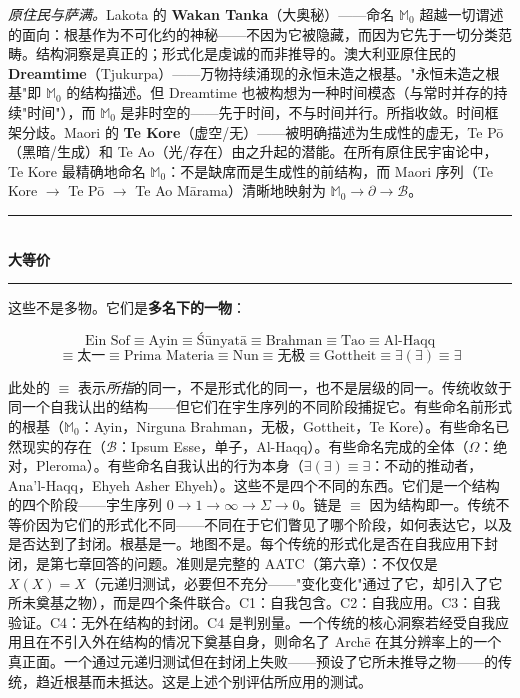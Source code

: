 \documentclass[10pt, openany, oneside]{book}
\renewcommand{\normalsize}{\fontsize{10}{13}\selectfont}
\begin{document}
\textit{原住民与萨满。}Lakota 的 \textbf{Wakan Tanka}（大奥秘）——命名 $\mathbb{M}_0$ 超越一切谓述的面向：根基作为不可化约的神秘——不因为它被隐藏，而因为它先于一切分类范畴。结构洞察是真正的；形式化是虔诚的而非推导的。澳大利亚原住民的 \textbf{Dreamtime}（Tjukurpa）——万物持续涌现的永恒未造之根基。"永恒未造之根基"即 $\mathbb{M}_0$ 的结构描述。但 Dreamtime 也被构想为一种时间模态（与常时并存的持续"时间"），而 $\mathbb{M}_0$ 是非时空的——先于时间，不与时间并行。所指收敛。时间框架分歧。Maori 的 \textbf{Te Kore}（虚空/无）——被明确描述为生成性的虚无，Te P\={o}（黑暗/生成）和 Te Ao（光/存在）由之升起的潜能。在所有原住民宇宙论中，Te Kore 最精确地命名 $\mathbb{M}_0$：不是缺席而是生成性的前结构，而 Maori 序列（Te Kore $\to$ Te P\={o} $\to$ Te Ao M\={a}rama）清晰地映射为 $\mathbb{M}_0 \to \partial \to \mathcal{B}$。

\vspace{1em}

\begin{center}
    \rule{0.3\textwidth}{0.4pt}\\[0.5em]
    {\normalsize\bfseries\scshape 大等价}\\[0.3em]
    \rule{0.3\textwidth}{0.4pt}
\end{center}

\vspace{0.8em}

\noindent 这些不是多物。它们是\textbf{多名下的一物}：

$$\text{Ein Sof} \equiv \text{Ayin} \equiv \text{\'{S}\={u}nyat\={a}} \equiv \text{Brahman} \equiv \text{Tao} \equiv \text{Al-Haqq}$$
$$\equiv \text{太一} \equiv \text{Prima Materia} \equiv \text{Nun} \equiv \text{无极} \equiv \text{Gottheit} \equiv \exists(\exists) \equiv \exists$$

\noindent 此处的 $\equiv$ 表示\textit{所指}的同一，不是形式化的同一，也不是层级的同一。传统收敛于同一个自我认出的结构——但它们在宇生序列的不同阶段捕捉它。有些命名前形式的根基（$\mathbb{M}_0$：Ayin，Nirguna Brahman，无极，Gottheit，Te Kore）。有些命名已然现实的存在（$\mathcal{B}$：Ipsum Esse，单子，Al-Haqq）。有些命名完成的全体（$\Omega$：绝对，Pleroma）。有些命名自我认出的行为本身（$\exists(\exists) \equiv \exists$：不动的推动者，Ana'l-Haqq，Ehyeh Asher Ehyeh）。这些不是四个不同的东西。它们是一个结构的四个阶段——宇生序列 $0 \to 1 \to \infty \to \Sigma \to 0$。链是 $\equiv$ 因为结构即一。传统不等价因为它们的形式化不同——不同在于它们瞥见了哪个阶段，如何表达它，以及是否达到了封闭。根基是一。地图不是。每个传统的形式化是否在自我应用下封闭，是第七章回答的问题。准则是完整的 AATC（第六章）：不仅仅是 $X(X) = X$（元递归测试，必要但不充分——"变化变化"通过了它，却引入了它所未奠基之物），而是四个条件联合。C1：自我包含。C2：自我应用。C3：自我验证。C4：无外在结构的封闭。C4 是判别量。一个传统的核心洞察若经受自我应用且在不引入外在结构的情况下奠基自身，则命名了 Arch\={e} 在其分辨率上的一个真正面。一个通过元递归测试但在封闭上失败——预设了它所未推导之物——的传统，趋近根基而未抵达。这是上述个别评估所应用的测试。
\end{document}
